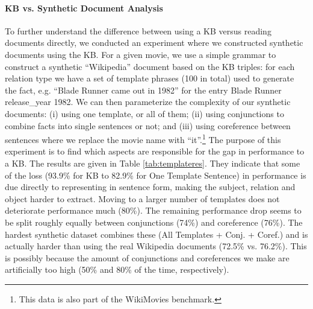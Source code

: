 \documentclass[11pt,letterpaper]{article}
\newcommand{\WikiMovies}{{\sc WikiMovies}\xspace}
\begin{document}
\paragraph{KB vs. Synthetic Document Analysis}
To further understand the difference between using a KB versus reading documents directly,
we conducted an experiment where we constructed synthetic documents using the KB.
For a given movie, we use a simple grammar to construct a synthetic ``Wikipedia'' document
based on the KB triples: for each relation type we have a set of template phrases
(100 in total)  used to generate the fact, e.g.
``Blade Runner came out in 1982'' for the entry {\sc Blade Runner release\_year 1982}.
We can then parameterize the complexity of our synthetic documents:
(i) using one template, or all of them;
(ii) using conjunctions to combine facts into single sentences or not;
and (iii) using coreference between sentences where we replace the movie name with ``it''.\footnote{This data is also part of the \WikiMovies benchmark.}
The purpose of this experiment is to find which aspects are responsible for the gap
in performance to a KB.
The results are given in Table \ref{tab:templateres}.
They indicate that some of the loss (93.9\% for KB to 82.9\% for One Template Sentence)
 in performance is due directly to representing in sentence form, making the subject, relation
and object harder to extract.
Moving to a larger number of templates does not deteriorate performance much (80\%).
 The remaining performance drop seems to be split roughly
equally between conjunctions (74\%) and coreference (76\%).
The hardest synthetic dataset combines these (All Templates + Conj. + Coref.) and
is actually harder than using the real Wikipedia documents (72.5\% vs. 76.2\%).
This is possibly because the amount of conjunctions and coreferences we make are artificially
too high (50\% and 80\% of the time, respectively).
\end{document}
